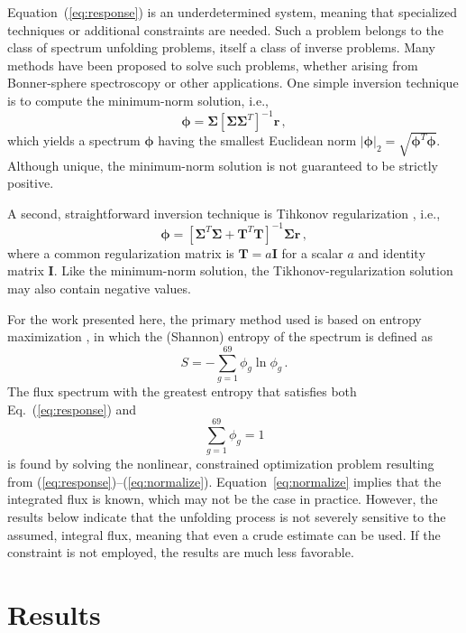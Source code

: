 \documentclass[journal]{IEEEtran}
\newcommand{\EQ}[1]{Eq.~(\ref{#1})}               %
\newcommand{\EQUATION}[1]{Equation~(\ref{#1})}    %
\begin{document}
\EQUATION{eq:response} is an underdetermined system, meaning that specialized techniques or additional constraints are needed.  Such a problem belongs to the class of  spectrum unfolding problems, itself a class of inverse problems.  Many methods have been proposed to solve such problems, whether arising from Bonner-sphere spectroscopy or other applications.  One simple inversion technique is to compute the minimum-norm solution, i.e.,
\begin{equation}
  \bm{\phi} =  \bm{\Sigma}  [\bm{\Sigma} \bm{\Sigma}^T]^{-1}\mathbf{r} \, ,
\end{equation}
which yields a spectrum $\bm{\phi}$ having the smallest Euclidean norm $|\bm{\phi}|_2 = \sqrt{\bm{\phi}^T\bm{\phi}}$.  Although unique, the minimum-norm solution is not guaranteed to be strictly positive.  

A second, straightforward inversion technique is Tihkonov regularization \cite{mueller2012lni}, i.e.,
\begin{equation}
 \bm{\phi} = [\bm{\Sigma}^T \bm{\Sigma}+ \mathbf{T}^T \mathbf{T}]^{-1} \bm{\Sigma} \mathbf{r} \, ,
\end{equation}
where a common regularization matrix is $\mathbf{T} = a\mathbf{I}$ for a scalar $a$ and identity matrix $\mathbf{I}$.  Like the minimum-norm solution, the Tikhonov-regularization solution may also contain negative values.

For the work presented here, the primary method used is based on entropy maximization \cite{itoh1989neutron}, in which the (Shannon) entropy of the spectrum is defined as
\begin{equation}
 S = -\sum^{69}_{g=1} \phi_g \ln \phi_g \, .
\label{eq:entropy}
\end{equation}
The flux spectrum with the greatest entropy that satisfies both \EQ{eq:response} and
\begin{equation}
 \sum^{69}_{g=1} \phi_g = 1
\label{eq:normalize}
\end{equation}
is found by solving the nonlinear, constrained optimization problem resulting from (\ref{eq:response})--(\ref{eq:normalize}).  Equation~\ref{eq:normalize} implies that the integrated flux is known, which may not be the case in practice.  However, the results below indicate that the unfolding process is not severely sensitive to the assumed, integral flux, meaning that even a crude estimate can be used.  If the constraint is not employed, the results are much less favorable.


\section{Results}
\end{document}
